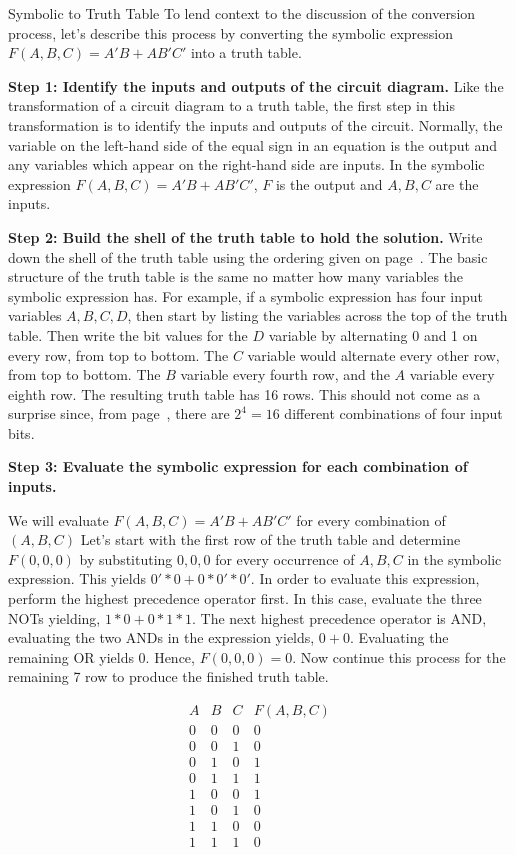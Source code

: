 \begin{process}{Symbolic to Truth Table}
\label{process:representationSymToTT}
To lend context to the discussion of the conversion process, let's describe this
process by converting the symbolic expression
$F(A,B,C) = A'B + AB'C'$ into a truth table.

\textbf{Step 1:  Identify the inputs and outputs of the circuit diagram.}
Like the transformation of a circuit diagram to a truth table, the
first step in this transformation is to identify the inputs and outputs
of the circuit.  Normally, the variable on the left-hand side
of the equal sign in an equation is the output and any variables
which appear on the right-hand side are inputs.  In the symbolic expression
$F(A,B,C) = A'B + AB'C'$, $F$ is the output and $A,B,C$ are the inputs.

\textbf{Step 2:  Build the shell of the truth table to hold the solution.}
Write down the shell of the truth table using the
ordering given on page~\pageref{page:TTshell}.  The basic structure of the
truth table is the same no matter how many variables the symbolic
expression has.
For example, if a symbolic expression has four input variables $A,B,C,D$,
then start by listing the variables across the top of the truth table.
Then write the bit values for the $D$ variable by alternating 0
and 1 on every row, from top to bottom. The $C$ variable would alternate
every other row, from top to bottom.  The $B$ variable every
fourth row, and the $A$ variable every eighth row.  The resulting
truth table has 16 rows.  This should not come as a surprise since,
from page~\pageref{page:two-to-N}, there are
$2^4=16$ different combinations of four input bits.

\textbf{Step 3: Evaluate the symbolic expression for each combination of inputs.}

We will evaluate $F(A,B,C) = A'B + AB'C'$ for every combination of $(A,B,C)$  Let's
start with the first row of the truth table and determine $F(0,0,0)$ by
substituting $0,0,0$ for every occurrence of $A,B,C$ in the symbolic
expression.  This yields $0'*0+0*0'*0'$.  In order to evaluate this expression,
perform the highest precedence operator first.  In this case, evaluate
the three NOTs yielding, $1*0+0*1*1$.  The next highest
precedence operator is AND, evaluating the two ANDs in the expression
yields, $0+0$.   Evaluating the remaining OR yields 0.  Hence, $F(0,0,0)=0$.
Now continue this process for the remaining 7 row to produce the finished
truth table.

$$
\begin{array}{c|c|c||c}
A & B & C & F(A,B,C) \\ \hline \hline
0 & 0 & 0 &  0  \\ \hline
0 & 0 & 1 &  0  \\ \hline
0 & 1 & 0 &  1  \\ \hline
0 & 1 & 1 &  1  \\ \hline
1 & 0 & 0 &  1  \\ \hline
1 & 0 & 1 &  0  \\ \hline
1 & 1 & 0 &  0  \\ \hline
1 & 1 & 1 &  0
\end{array} $$
\end{process}

